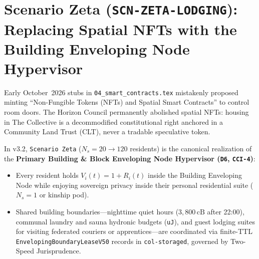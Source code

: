 \section{Scenario Zeta (\texttt{SCN-ZETA-LODGING}): Replacing Spatial NFTs with the Building Enveloping Node Hypervisor}
\label{sec:ch11-zeta}

Early October~2026 stubs in \texttt{04\_smart\_contracts.tex} mistakenly proposed minting ``Non-Fungible Tokens (NFTs) and Spatial Smart Contracts'' to control room doors. The Horizon Council permanently abolished spatial NFTs: housing in The Collective is a decommodified constitutional right anchored in a Community Land Trust (CLT), never a tradable speculative token.

In v3.2, \texttt{Scenario Zeta} ($N_s = 20 \to 120$ residents) is the canonical realization of the \textbf{Primary Building \& Block Enveloping Node Hypervisor (\texttt{D6}, \texttt{CCI-4})}:
\begin{itemize}
    \item Every resident holds $V_i(t) = 1 + R_i(t)$ inside the Building Enveloping Node while enjoying sovereign privacy inside their personal residential suite ($N_s = 1$ or kinship pod).
    \item Shared building boundaries---nighttime quiet hours ($3{,}800\,\mathrm{cB}$ after 22:00), communal laundry and sauna hydronic budgets (\texttt{uJ}), and guest lodging suites for visiting federated couriers or apprentices---are coordinated via finite-TTL \texttt{EnvelopingBoundaryLeaseV50} records in \texttt{col-storaged}, governed by Two-Speed Jurisprudence.
\end{itemize}

